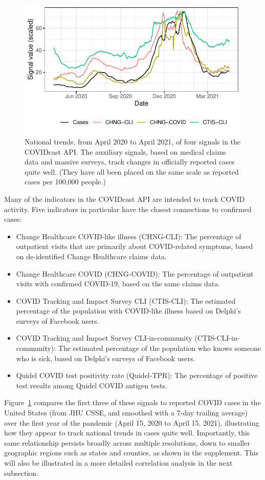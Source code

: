 \documentclass[9pt,twocolumn,twoside,lineno]{pnas-new}
\begin{document}
\begin{figure}[t]
  \centering
  \includegraphics[width=\columnwidth]{fig/time_trends_national.pdf}
  \caption{National trends, from April 2020 to April 2021, of four signals in
    the COVIDcast API. The auxiliary signals, based on medical claims data and
    massive surveys, track changes in officially reported cases quite
    well. (They have all been placed on the same scale as reported cases per
    100,000 people.)}
  \label{fig:time_trends_national}
\end{figure}

Many of the indicators in the COVIDcast API are intended to track COVID
activity. Five indicators in particular have the closest connections to
confirmed cases:
\begin{itemize}
\item Change Healthcare COVID-like illness (CHNG-CLI): The percentage of
  outpatient visits that are primarily about COVID-related symptoms, based on
  de-identified Change Healthcare claims data.
\item Change Healthcare COVID (CHNG-COVID): The percentage of outpatient visits
  with confirmed COVID-19, based on the same claims data.
\item COVID Tracking and Impact Survey CLI (CTIS-CLI): The estimated percentage
  of the population with COVID-like illness based on Delphi's surveys of
  Facebook users.
\item COVID Tracking and Impact Survey CLI-in-community (CTIS-CLI-in-community):
  The estimated percentage of the population who knows someone who is sick,
  based on Delphi's surveys of Facebook users.
\item Quidel COVID test positivity rate (Quidel-TPR): The percentage of positive
  test results among Quidel COVID antigen tests.
\end{itemize}
Figure~\ref{fig:time_trends_national} compares the first three of these signals
to reported COVID cases in the United States (from JHU CSSE, and smoothed with a
7-day trailing average) over the first year of the pandemic (April 15, 2020 to
April 15, 2021), illustrating how they  appear to track national trends in cases
quite well. Importantly, this same relationship persists broadly across multiple
resolutions, down to smaller geographic regions such as states and counties, as
shown in the supplement. This will also be illustrated in a more detailed
correlation analysis in the next subsection.
\end{document}
